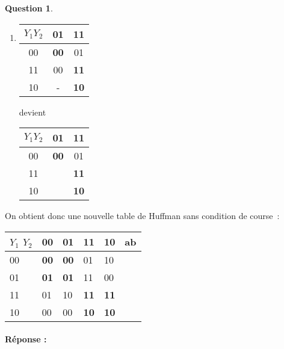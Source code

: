 \documentclass[11pt,a4paper,dvipsnames,]{article}
\theoremstyle{definition}%
\newtheorem{Q}{Question}[] %
\newcommand{\reponse}[1]{%
	\ifthenelse {\boolean{corrige}} {\paragraph{Réponse :} \color{darkblue}   #1\color{black}} {}
 }
\begin{document}
\begin{Q}
\begin{enumerate}
{\begin{enumerate}
				\item
				\begin{tabular}{|c|c|c|}\hline
					$Y_1Y_2$ & 01 & 11 \\ \hline
					00 & \textbf{00} & 01 \\ \hline
					11 & 00 & \textbf{11} \\ \hline
					10 & - & \textbf{10} \\ \hline
				\end{tabular}
				devient
				\begin{tabular}{|c|c|c|}\hline
					$Y_1Y_2$ & 01 & 11 \\ \hline
					00 & \textbf{00} & 01 \\ \hline
					11 & \color{red}{10} & \textbf{11} \\ \hline
					10 & \color{red}{00} & \textbf{10} \\ \hline
				\end{tabular}
			\end{enumerate}

			On obtient donc une nouvelle table de Huffman sans condition de course~:
			\begin{center}
				\begin{tabular}{|l|l|l|l|l|l}
				\hline
				 $Y_1$ $Y_2$ & 00         & 01         & 11         & 10         & \multicolumn{1}{l|}{ab} \\ \hline
				00 & \textbf{00} & \textbf{00} & 01          & 10          &    \\ \cline{1-5}
				01 & \textbf{01} & \textbf{01} & 11          & 00          &    \\ \cline{1-5}
				11 & 01          & 10          & \textbf{11} & \textbf{11} &    \\ \cline{1-5}
				10 & 00          & 00          & \textbf{10} & \textbf{10} &    \\ \cline{1-5}
				\end{tabular}
			\end{center}
		}
	\end{enumerate}

\reponse{}
\end{Q}
\end{document}
